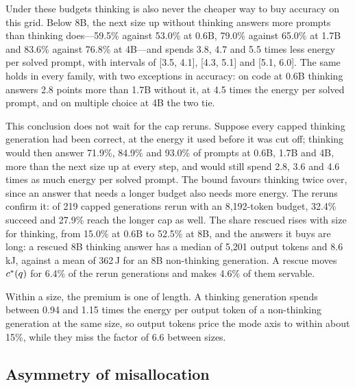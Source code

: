 Under these budgets thinking is also never the cheaper way to buy accuracy on
this grid. Below 8B, the next size up without thinking answers more prompts
than thinking does---59.5\% against 53.0\% at 0.6B, 79.0\% against 65.0\% at
1.7B and 83.6\% against 76.8\% at 4B---and spends 3.8, 4.7 and 5.5 times less
energy per solved prompt, with intervals of [3.5, 4.1], [4.3, 5.1] and [5.1,
6.0]. The same holds in every family, with two exceptions in accuracy: on
code at 0.6B thinking answers 2.8 points more than 1.7B without it, at 4.5
times the energy per solved prompt, and on multiple choice at 4B the two tie.

This conclusion does not wait for the cap reruns. Suppose every capped
thinking generation had been correct, at the energy it used before it was cut
off; thinking would then answer 71.9\%, 84.9\% and 93.0\% of prompts at 0.6B,
1.7B and 4B, more than the next size up at every step, and would still spend
2.8, 3.6 and 4.6 times as much energy per solved prompt. The bound favours
thinking twice over, since an answer that needs a longer budget also needs
more energy. The reruns confirm it: of 219 capped generations rerun with an
8{,}192-token budget, 32.4\% succeed and 27.9\% reach the longer cap as well.
The share rescued rises with size for thinking, from 15.0\% at 0.6B to 52.5\%
at 8B, and the answers it buys are long: a rescued 8B thinking answer has a
median of 5{,}201 output tokens and 8.6\,kJ, against a mean of 362\,J for an
8B non-thinking generation. A rescue moves $c^{*}(q)$ for 6.4\% of the rerun
generations and makes 4.6\% of them servable.

Within a size, the premium is one of length. A thinking generation spends
between 0.94 and 1.15 times the energy per output token of a non-thinking
generation at the same size, so output tokens price the mode axis to within
about 15\%, while they miss the factor of 6.6 between sizes.

\subsection{Asymmetry of misallocation}
\label{sec:results-asymmetry}

